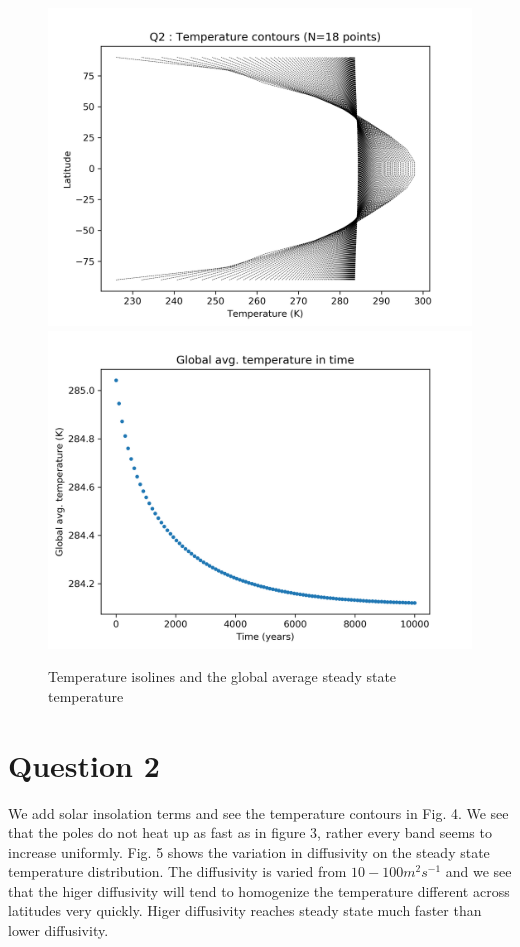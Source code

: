\documentclass{article}
\begin{document}
\begin{figure}
\includegraphics[scale=0.7]{tcont_q1.png} 
\includegraphics[scale=0.7]{tavg_q1.png}
\caption{Temperature isolines and the global average steady state temperature}
\end{figure}

\section*{Question 2}
We add solar insolation terms and see the temperature contours in Fig. 4. We see that the poles do not heat up as fast as in figure 3, rather every band seems to increase uniformly. Fig. 5 shows the variation in diffusivity on the steady state temperature distribution. The diffusivity is varied from $10-100 m^2s^{-1}$ and we see that the higer diffusivity will tend to homogenize the temperature different across latitudes very quickly.
Higer diffusivity reaches steady state much faster than lower diffusivity.
\end{document}
